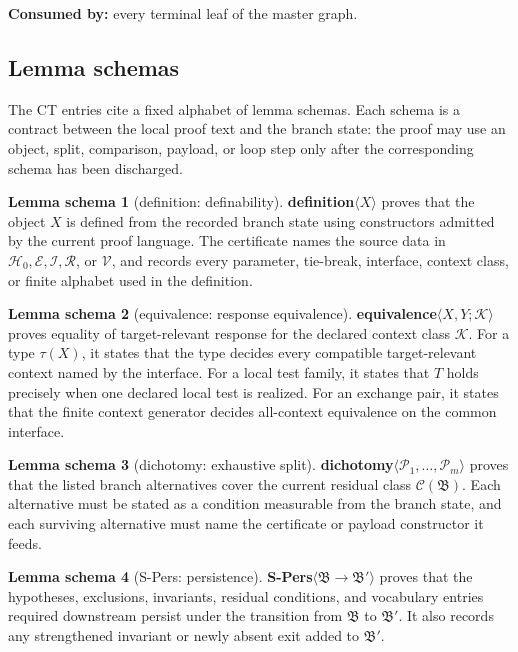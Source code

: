 \documentclass[
  11pt,
]{article}
\theoremstyle{definition}
\newtheorem{lemmaschema}{Lemma schema}[section]
\begin{document}
\noindent\textbf{Consumed by:} every terminal leaf of the master graph.

\subsection{Lemma schemas}\label{data-lemma-schemas}
The CT entries cite a fixed alphabet of lemma schemas.  Each schema is a
contract between the local proof text and the branch state: the proof may
use an object, split, comparison, payload, or loop step only after the
corresponding schema has been discharged.

\begin{lemmaschema}[definition: definability]\label{schema:s-def}
\textbf{definition}\(\langle X\rangle\) proves that the object \(X\) is
defined from the recorded branch state using constructors admitted by the
current proof language.  The certificate names the source data in
\(\mathcal H_0,\mathcal E,\mathcal I,\mathcal R\), or \(\mathcal V\),
and records every parameter, tie-break, interface, context class, or
finite alphabet used in the definition.
\end{lemmaschema}

\begin{lemmaschema}[equivalence: response equivalence]\label{schema:s-equiv}
\textbf{equivalence}\(\langle X,Y;\mathcal K\rangle\) proves equality of
target-relevant response for the declared context class \(\mathcal K\).
For a type \(\tau(X)\), it states that the type decides every compatible
target-relevant context named by the interface.  For a local test family,
it states that \(T\) holds precisely when one declared local test is
realized.  For an exchange pair, it states that the finite context
generator decides all-context equivalence on the common interface.
\end{lemmaschema}

\begin{lemmaschema}[dichotomy: exhaustive split]\label{schema:s-dich}
\textbf{dichotomy}\(\langle\mathcal P_1,\ldots,\mathcal P_m\rangle\)
proves that the listed branch alternatives cover the current residual
class \(\mathcal C(\mathfrak B)\).  Each alternative must be stated as a
condition measurable from the branch state, and each surviving
alternative must name the certificate or payload constructor it feeds.
\end{lemmaschema}

\begin{lemmaschema}[S-Pers: persistence]\label{schema:s-pers}
\textbf{S-Pers}\(\langle\mathfrak B\to\mathfrak B'\rangle\) proves that
the hypotheses, exclusions, invariants, residual conditions, and
vocabulary entries required downstream persist under the transition from
\(\mathfrak B\) to \(\mathfrak B'\).  It also records any strengthened
invariant or newly absent exit added to \(\mathfrak B'\).
\end{lemmaschema}
\end{document}
